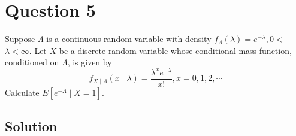 \section*{Question 5}

Suppose \( \Lambda \) is a continuous random variable with density \( f_{\Lambda}(\lambda)=e^{-\lambda}, 0< \) \( \lambda<\infty \).
Let \( X \) be a discrete random variable whose conditional mass function, conditioned on \( \Lambda \), is given by
\[
    f_{X \mid \Lambda}(x \mid \lambda)=\frac{\lambda^{x} e^{-\lambda}}{x!}, x=0,1,2, \cdots
\]
Calculate \( E\left[e^{-\Lambda} \mid X=1\right] \).

\subsection*{Solution}
